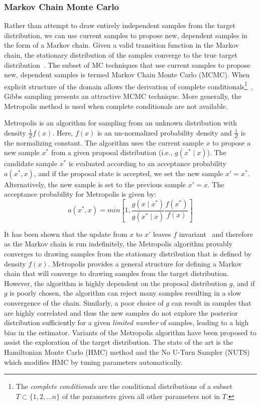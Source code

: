 \subsubsection{Markov Chain Monte Carlo}\label{sec:mcmc}
Rather than attempt to draw entirely independent samples from the target distribution, we can use current samples to propose new, dependent samples in the form of a Markov chain. Given a valid transition function in the Markov chain, the stationary distribution of the samples converge to the true target distribution~\citep{mackay1998introduction}. The subset of MC techniques that use current samples to propose new, dependent samples is termed Markov Chain Monte Carlo (MCMC). When explicit structure of the domain allows the derivation of complete conditionals\footnote{The \textit{complete conditionals} are the conditional distributions of a subset $T \subset \{ 1, 2, \hdots n \}$ of the parameters given all other parameters not in $T$.}~\citep{mackay1998introduction}, Gibbs sampling presents an attractive MCMC technique. More generally, the Metropolis method is used when complete conditionals are not available.

Metropolis is an algorithm for sampling from an unknown distribution with density $\frac{1}{Z} f(x)$. Here, $f(x)$ is an un-normalized probability density and $\frac{1}{Z}$ is the normalizing constant. The algorithm uses the current sample $x$ to propose a new sample $x^*$ from a given proposal distribution (i.e., $g(x^* \mid x)$). The candidate sample $x^*$ is evaluated according to an acceptance probability $a(x^*, x)$, and if the proposal state is accepted, we set the new sample $x' = x^*$. Alternatively, the new sample is set to the previous sample $x' = x$. The acceptance probability for Metropolis is given by:
\begin{equation}
	a(x^*, x) = min \left[ 1, \frac{g(x \mid x^*)}{g(x^* \mid x)} \frac{f(x^*)}{f(x)} \right]
\end{equation}

It has been shown that the update from $x$ to $x'$ leaves $f$ invariant~\citep{mackay1998introduction, gelman2014bayesian} and therefore as the Markov chain is run indefinitely, the Metropolis algorithm provably converges to drawing samples from the stationary distribution that is defined by density $f(x)$. Metropolis provides a general structure for defining a Markov chain that will converge to drawing samples from the target distribution. However, the algorithm is highly dependent on the proposal distribution $g$, and if $g$ is poorly chosen, the algorithm can reject many samples resulting in a slow convergence of the chain. Similarly, a poor choice of $g$ can result in samples that are highly correlated and thus the new samples do not explore the posterior distribution sufficiently for a given \textit{limited number} of samples, leading to a high bias in the estimator. Variants of the Metropolis algorithm have been proposed to assist the exploration of the target distribution. The state of the art is the Hamiltonian Monte Carlo (HMC) method and the No U-Turn Sampler (NUTS) which modifies HMC by tuning parameters automatically.

